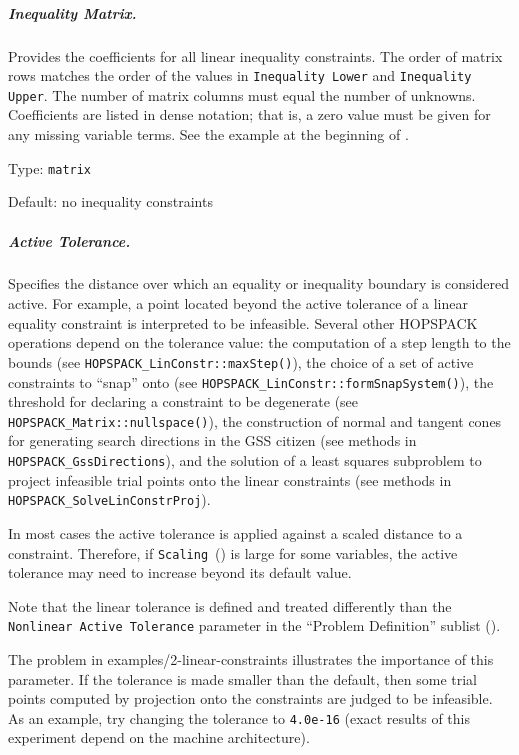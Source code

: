 \subparagraph{Inequality Matrix.}  \label{param:LC-ineqmat}
Provides the coefficients for all linear inequality constraints.
The order of matrix rows matches the order of the values in
{\tt Inequality Lower} and {\tt Inequality Upper}.
The number of matrix columns must equal the number of unknowns.
Coefficients are listed in dense notation; that is, a zero value must be
given for any missing variable terms.
See the example at the beginning of .

\hspace{0.2in}
Type: {\tt matrix}

\hspace{0.2in}
Default: no inequality constraints

\subparagraph{Active Tolerance.}  \label{param:LC-acttol}
Specifies the distance over which an equality or inequality boundary is
considered active.  For example, a point located beyond the active tolerance
of a linear equality constraint is interpreted to be infeasible.
Several other HOPSPACK operations depend on the tolerance value:
the computation of a step length to the bounds
(see {\tt HOPSPACK\_LinConstr::maxStep()}),
the choice of a set of active constraints to ``snap'' onto
(see {\tt HOPSPACK\_LinConstr::formSnapSystem()}),
the threshold for declaring a constraint to be degenerate
(see {\tt HOPSPACK\_Matrix::nullspace()}),
the construction of normal and tangent cones for generating search
directions in the GSS citizen (see methods in {\tt HOPSPACK\_GssDirections}),
and the solution of a least squares subproblem to project infeasible trial
points onto the linear constraints
(see methods in {\tt HOPSPACK\_SolveLinConstrProj}).

\noindent
In most cases the active tolerance is applied against a scaled distance
to a constraint.  Therefore, if {\tt Scaling}~()
is large for some variables, the active tolerance may need to increase
beyond its default value.

\noindent
Note that the linear tolerance is defined and treated differently
than the {\tt Nonlinear Active Tolerance} parameter
in the ``Problem Definition'' sublist ().

\noindent
The problem in {\sf examples/2-linear-constraints} illustrates the importance of
this parameter.  If the tolerance is made smaller than the default, then some
trial points computed by projection onto the constraints are judged to be
infeasible.  As an example, try changing the tolerance to
{\tt 4.0e-16} (exact results of this experiment depend on the machine
architecture).

